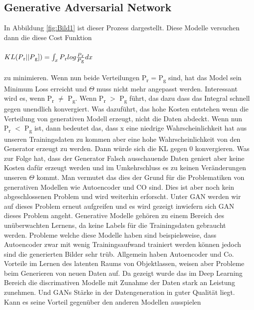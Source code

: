 \documentclass{llncs}
\begin{document}
\subsection{Generative Adversarial Network}

In Abbildung \ref{fig:Bild1} ist dieser Prozess dargestellt. Diese Modelle versuchen dann die diese Cost Funktion  
\\
\\
\begin{math}
KL(P\textsubscript{r}|| P\textsubscript{g}])=\int_x P\textsubscript{r}log\frac{P\textsubscript{r}}{P\textsubscript{g}}dx                     
\end{math}
\\
\\
zu minimieren. Wenn nun beide Verteilungen P\textsubscript{r} = P\textsubscript{g} sind, hat das Model sein Minimum Loss erreicht und $\Theta$ muss nicht mehr angepasst werden. Interessant wird es, wenn P\textsubscript{r} $\ne$ P\textsubscript{g}.
Wenn  P\textsubscript{r} $>$ P\textsubscript{g} führt, das dazu dass das Integral schnell gegen unendlich konvergiert. Was dazuführt, das hohe Kosten entstehen wenn die  Verteilung von generativen Modell erzeugt, nicht die Daten abdeckt. Wenn nun  P\textsubscript{r} $<$ P\textsubscript{g} ist, dann bedeutet das, dass x eine niedrige Wahrscheinlichkeit hat aus unseren Trainingsdaten zu kommen aber eine hohe Wahrscheinlichkeit von den Generator erzeugt zu werden. Dann würde sich die KL gegen 0 konvergieren. Was zur Folge hat, dass der Generator Falsch ausschauende Daten geniert aber keine Kosten dafür erzeugt werden und im Umkehrschluss es zu keinen Veränderungen unseren $\Theta$ kommt. Man vermutet das dies der Grund für die Problematiken von generativen Modellen wie Autoencoder und CO sind. Dies ist aber noch kein abgeschlossenen Problem und wird weiterhin erforscht\cite{improvingan}.
Unter GAN werden wir auf dieses Problem erneut aufgreifen und es wird gezeigt inwiefern sich GAN dieses Problem angeht. Generative Modelle gehören zu einem Bereich des unüberwachten Lernens, da keine Labels für die Trainingsdaten gebraucht werden. Probleme welche diese Modelle haben sind beispielsweise, dass Autoencoder zwar mit wenig Trainingsaufwand trainiert werden können jedoch sind die generierten Bilder sehr trüb. Allgemein haben Autoencoder und Co. Vorteile  im Lernen des latenten Raums von Objektlassen, weisen aber Probleme beim Generieren von neuen Daten auf. Da gezeigt wurde das im Deep Learning Bereich die discrimativen Modelle mit Zunahme der Daten stark an Leistung zunehmen. Und GANs Stärke in der Datengeneration in guter Qualität liegt. Kann es seine Vorteil gegenüber den anderen Modellen ausspielen\cite{improving}
\end{document}
